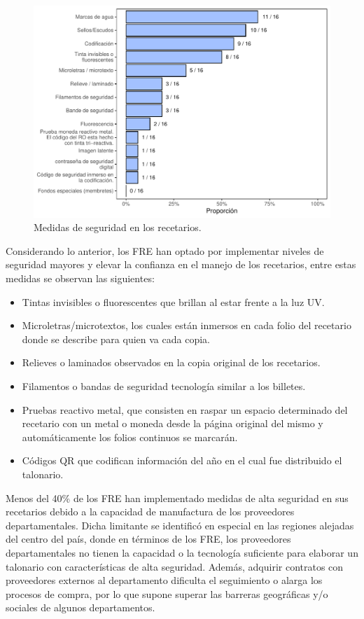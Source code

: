 \documentclass[
]{book}
\begin{document}
\begin{figure}

{\centering \includegraphics[width=0.9\linewidth]{InformeFinal_files/figure-latex/MedidasSeguridadRec-1} 

}

\caption{Medidas de seguridad en los recetarios.}\label{fig:MedidasSeguridadRec}
\end{figure}

Considerando lo anterior, los FRE han optado por implementar niveles de seguridad mayores y elevar la confianza en el manejo de los recetarios, entre estas medidas se observan las siguientes:

\begin{itemize}
\item
  Tintas invisibles o fluorescentes que brillan al estar frente a la luz UV.
\item
  Microletras/microtextos, los cuales están inmersos en cada folio del recetario donde se describe para quien va cada copia.
\item
  Relieves o laminados observados en la copia original de los recetarios.
\item
  Filamentos o bandas de seguridad tecnología similar a los billetes.
\item
  Pruebas reactivo metal, que consisten en raspar un espacio determinado del recetario con un metal o moneda desde la página original del mismo y automáticamente los folios continuos se marcarán.
\item
  Códigos QR que codifican información del año en el cual fue distribuido el talonario.
\end{itemize}

Menos del 40\% de los FRE han implementado medidas de alta seguridad en sus recetarios debido a la capacidad de manufactura de los proveedores departamentales. Dicha limitante se identificó en especial en las regiones alejadas del centro del país, donde en términos de los FRE, los proveedores departamentales no tienen la capacidad o la tecnología suficiente para elaborar un talonario con características de alta seguridad. Además, adquirir contratos con proveedores externos al departamento dificulta el seguimiento o alarga los procesos de compra, por lo que supone superar las barreras geográficas y/o sociales de algunos departamentos.
\end{document}
